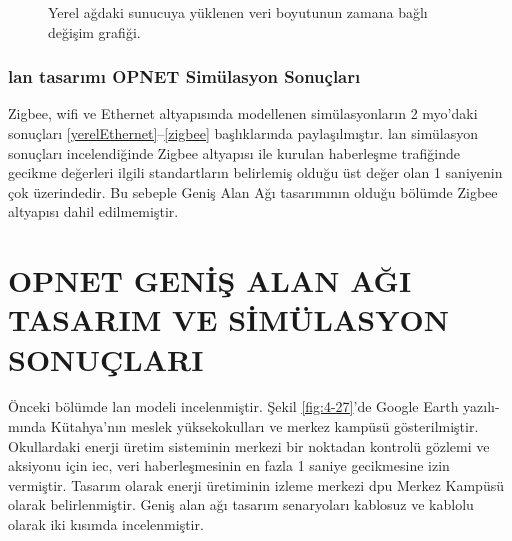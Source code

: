 \begin{figure}[htbp]


\centering


\caption{Yerel ağdaki sunucuya yüklenen veri boyutunun zamana bağlı değişim grafiği.}
\label{fig:4-26}
\end{figure}


\newpage
\subsubsection{\gls{lan} tasarımı OPNET Simülasyon Sonuçları}


Zigbee, \gls{wifi} ve Ethernet altyapısında modellenen simülasyonların 2 \gls{myo}'daki sonuçları \ref{yerelEthernet}--\ref{zigbee} başlıklarında paylaşılmıştır. \gls{lan} simülasyon sonuçları incelendiğinde Zigbee altyapısı ile kurulan haberleşme trafiğinde gecikme değerleri ilgili standartların belirlemiş olduğu üst değer olan 1 saniyenin çok üzerindedir. Bu sebeple Geniş Alan Ağı tasarımının olduğu bölümde Zigbee altyapısı dahil edilmemiştir.

\section{OPNET GENİŞ ALAN AĞI TASARIM VE SİMÜLASYON SONUÇLARI}

Önceki bölümde \gls{lan} modeli incelenmiştir. Şekil \ref{fig:4-27}’de Google Earth yazılı-mında Kütahya’nın meslek yüksekokulları ve merkez kampüsü gösterilmiştir. Okullardaki enerji üretim sisteminin merkezi bir noktadan kontrolü gözlemi ve aksiyonu için \gls{iec}, veri haberleşmesinin en fazla 1 saniye gecikmesine izin vermiştir. Tasarım olarak enerji üretiminin izleme merkezi \gls{dpu} Merkez Kampüsü olarak belirlenmiştir. Geniş alan ağı tasarım senaryoları kablosuz ve kablolu olarak iki kısımda incelenmiştir.


